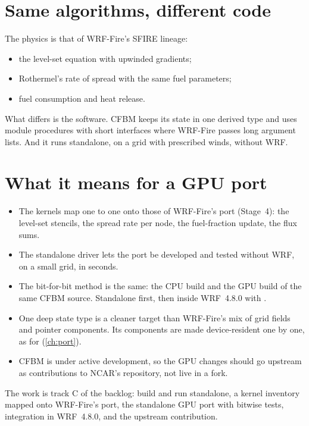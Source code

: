 \section{Same algorithms, different code}

The physics is that of WRF-Fire's SFIRE lineage:
\begin{itemize}
  \item the level-set equation with upwinded gradients;
  \item Rothermel's rate of spread with the same fuel parameters;
  \item fuel consumption and heat release.
\end{itemize}
What differs is the software. CFBM keeps its state in one derived type and uses module procedures with short
interfaces where WRF-Fire passes long argument lists. And it runs standalone, on a grid with prescribed winds,
without WRF.

\section{What it means for a GPU port}

\begin{itemize}
  \item The kernels map one to one onto those of WRF-Fire's port (Stage~4): the level-set stencils, the spread rate per
    node, the fuel-fraction update, the flux sums.
  \item The standalone driver lets the port be developed and tested without WRF, on a small grid, in seconds.
  \item The bit-for-bit method is the same: the CPU build and the GPU build of the same CFBM source. Standalone first,
    then inside WRF~4.8.0 with .
  \item One deep state type is a cleaner target than WRF-Fire's mix of grid fields and pointer components. Its
    components are made device-resident one by one, as for  (\cref{ch:port}).
  \item CFBM is under active development, so the GPU changes should go upstream as contributions to NCAR's
    repository, not live in a fork.
\end{itemize}
The work is track C of the backlog: build and run standalone, a kernel inventory mapped onto WRF-Fire's port, the
standalone GPU port with bitwise tests, integration in WRF~4.8.0, and the upstream contribution.

